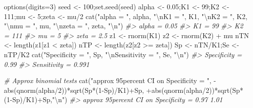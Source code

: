 \documentclass[
]{book}
\newenvironment{Shaded}{\begin{snugshade}}{\end{snugshade}}
\newcommand{\AttributeTok}[1]{\textcolor[rgb]{0.77,0.63,0.00}{#1}}
\newcommand{\CommentTok}[1]{\textcolor[rgb]{0.56,0.35,0.01}{\textit{#1}}}
\newcommand{\DecValTok}[1]{\textcolor[rgb]{0.00,0.00,0.81}{#1}}
\newcommand{\FloatTok}[1]{\textcolor[rgb]{0.00,0.00,0.81}{#1}}
\newcommand{\FunctionTok}[1]{\textcolor[rgb]{0.00,0.00,0.00}{#1}}
\newcommand{\NormalTok}[1]{#1}
\newcommand{\OtherTok}[1]{\textcolor[rgb]{0.56,0.35,0.01}{#1}}
\newcommand{\SpecialCharTok}[1]{\textcolor[rgb]{0.00,0.00,0.00}{#1}}
\newcommand{\StringTok}[1]{\textcolor[rgb]{0.31,0.60,0.02}{#1}}
\begin{document}
\begin{Shaded}
\begin{Highlighting}[]
\FunctionTok{options}\NormalTok{(}\AttributeTok{digits=}\DecValTok{3}\NormalTok{)}
\NormalTok{seed }\OtherTok{\textless{}{-}} \DecValTok{100}\NormalTok{;}\FunctionTok{set.seed}\NormalTok{(seed)}
\NormalTok{alpha }\OtherTok{\textless{}{-}} \FloatTok{0.05}\NormalTok{;K1 }\OtherTok{\textless{}{-}} \DecValTok{99}\NormalTok{;K2 }\OtherTok{\textless{}{-}} \DecValTok{111}\NormalTok{;mu }\OtherTok{\textless{}{-}} \DecValTok{5}\NormalTok{;zeta }\OtherTok{\textless{}{-}}\NormalTok{ mu}\SpecialCharTok{/}\DecValTok{2}
\FunctionTok{cat}\NormalTok{(}\StringTok{"alpha = "}\NormalTok{, alpha, }
    \StringTok{"}\SpecialCharTok{\textbackslash{}n}\StringTok{K1 = "}\NormalTok{, K1, }
    \StringTok{"}\SpecialCharTok{\textbackslash{}n}\StringTok{K2 = "}\NormalTok{, K2, }
    \StringTok{"}\SpecialCharTok{\textbackslash{}n}\StringTok{mu = "}\NormalTok{, mu, }
    \StringTok{"}\SpecialCharTok{\textbackslash{}n}\StringTok{zeta = "}\NormalTok{, zeta, }\StringTok{"}\SpecialCharTok{\textbackslash{}n}\StringTok{"}\NormalTok{)}
\CommentTok{\#\textgreater{} alpha =  0.05 }
\CommentTok{\#\textgreater{} K1 =  99 }
\CommentTok{\#\textgreater{} K2 =  111 }
\CommentTok{\#\textgreater{} mu =  5 }
\CommentTok{\#\textgreater{} zeta =  2.5}
\NormalTok{z1 }\OtherTok{\textless{}{-}} \FunctionTok{rnorm}\NormalTok{(K1)}
\NormalTok{z2 }\OtherTok{\textless{}{-}} \FunctionTok{rnorm}\NormalTok{(K2) }\SpecialCharTok{+}\NormalTok{ mu}
\NormalTok{nTN }\OtherTok{\textless{}{-}} \FunctionTok{length}\NormalTok{(z1[z1 }\SpecialCharTok{\textless{}}\NormalTok{ zeta])}
\NormalTok{nTP }\OtherTok{\textless{}{-}} \FunctionTok{length}\NormalTok{(z2[z2 }\SpecialCharTok{\textgreater{}=}\NormalTok{ zeta])}
\NormalTok{Sp }\OtherTok{\textless{}{-}}\NormalTok{ nTN}\SpecialCharTok{/}\NormalTok{K1;Se }\OtherTok{\textless{}{-}}\NormalTok{ nTP}\SpecialCharTok{/}\NormalTok{K2}
\FunctionTok{cat}\NormalTok{(}\StringTok{"Specificity = "}\NormalTok{, Sp, }
    \StringTok{"}\SpecialCharTok{\textbackslash{}n}\StringTok{Sensitivity = "}\NormalTok{, Se, }\StringTok{"}\SpecialCharTok{\textbackslash{}n}\StringTok{"}\NormalTok{)}
\CommentTok{\#\textgreater{} Specificity =  0.99 }
\CommentTok{\#\textgreater{} Sensitivity =  0.991}

\CommentTok{\# Approx binomial tests}
\FunctionTok{cat}\NormalTok{(}\StringTok{"approx 95percent CI on Specificity = "}\NormalTok{, }
    \SpecialCharTok{{-}}\FunctionTok{abs}\NormalTok{(}\FunctionTok{qnorm}\NormalTok{(alpha}\SpecialCharTok{/}\DecValTok{2}\NormalTok{))}\SpecialCharTok{*}\FunctionTok{sqrt}\NormalTok{(Sp}\SpecialCharTok{*}\NormalTok{(}\DecValTok{1}\SpecialCharTok{{-}}\NormalTok{Sp)}\SpecialCharTok{/}\NormalTok{K1)}\SpecialCharTok{+}\NormalTok{Sp, }
    \SpecialCharTok{+}\FunctionTok{abs}\NormalTok{(}\FunctionTok{qnorm}\NormalTok{(alpha}\SpecialCharTok{/}\DecValTok{2}\NormalTok{))}\SpecialCharTok{*}\FunctionTok{sqrt}\NormalTok{(Sp}\SpecialCharTok{*}\NormalTok{(}\DecValTok{1}\SpecialCharTok{{-}}\NormalTok{Sp)}\SpecialCharTok{/}\NormalTok{K1)}\SpecialCharTok{+}\NormalTok{Sp,}\StringTok{"}\SpecialCharTok{\textbackslash{}n}\StringTok{"}\NormalTok{)}
\CommentTok{\#\textgreater{} approx 95percent CI on Specificity =  0.97 1.01}


\end{Highlighting}
\end{Shaded}
\end{document}
